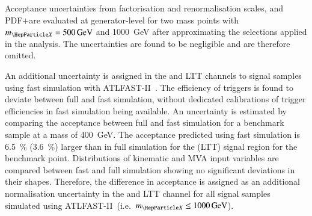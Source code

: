 Acceptance uncertainties from factorisation and renormalisation
scales, and PDF+\alphas are evaluated at generator-level for two mass
points with $\mX = \SI{500}{\GeV}$ and \SI{1000}{\GeV} after
approximating the selections applied in the analysis. The
uncertainties are found to be negligible and are therefore omitted.

An additional uncertainty is assigned in the \hadhad and \lephad LTT
channels to signal samples using fast simulation with
\textsc{ATLFAST-II}~\cite{SOFT-2010-01}. The efficiency of \tauhadvis
triggers is found to deviate between full and fast simulation, without
dedicated calibrations of \tauhadvis trigger efficiencies in fast
simulation being available. An uncertainty is estimated by comparing
the acceptance between full and fast simulation for a benchmark sample
at a mass of \SI{400}{\GeV}. The acceptance predicted using fast
simulation is \SI{6.5}{\percent} (\SI{3.6}{\percent}) larger than in
full simulation for the \hadhad (\lephad LTT) signal region for the
benchmark point. Distributions of kinematic and MVA input variables
are compared between fast and full simulation showing no significant
deviations in their shapes. Therefore, the difference in acceptance is
assigned as an additional normalisation uncertainty in the \hadhad and
\lephad LTT channel for all signal samples simulated using
\textsc{ATLFAST-II}~(i.e.\ $\mX \leq \SI{1000}{\GeV}$).

